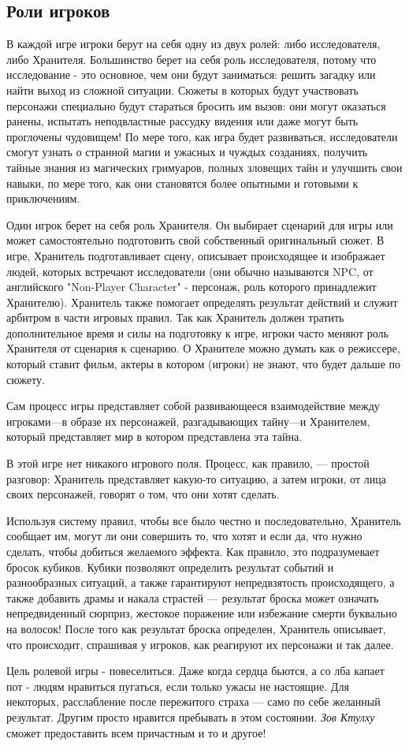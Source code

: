 \documentclass[letterpaper,twocolumn,openany, twoside, 8pt, usenames]{cocbook}
\begin{document}
\subsection*{Роли игроков}

В каждой игре игроки берут на себя одну из двух ролей: либо исследователя, либо Хранителя. Большинство берет на себя роль исследователя, потому что исследование - это основное, чем они будут заниматься: решить загадку или найти выход из сложной ситуации. Сюжеты в которых будут участвовать персонажи специально будут стараться бросить им вызов: они могут оказаться ранены, испытать неподвластные рассудку видения или даже могут быть проглочены чудовищем! По мере того, как игра будет развиваться, исследователи смогут узнать о странной магии и ужасных и чуждых созданиях, получить тайные знания из магических гримуаров, полных зловещих тайн и улучшить свои навыки, по мере того, как они становятся более опытными и готовыми к приключениям.

Один игрок берет на себя роль Хранителя. Он выбирает сценарий для игры или может самостоятельно подготовить свой собственный оригинальный сюжет. В игре, Хранитель подготавливает сцену, описывает происходящее и изображает людей, которых встречают исследователи (они обычно называются NPC, от английского "Non-Player Character" - персонаж, роль которого принадлежит Хранителю). Хранитель также помогает определять результат действий и служит арбитром в части игровых правил. Так как Хранитель должен тратить дополнительное время и силы на подготовку к игре, игроки часто меняют роль Хранителя от сценария к сценарию. О Хранителе можно думать как о режиссере, который ставит фильм, актеры в котором (игроки) не знают, что будет дальше по сюжету.

Сам процесс игры представляет собой развивающееся взаимодействие между игроками---в образе их персонажей, разгадывающих тайну---и Хранителем, который представляет мир в котором представлена эта тайна.

В этой игре нет никакого игрового поля. Процесс, как правило, --- простой разговор: Хранитель представляет какую-то ситуацию, а затем игроки, от лица своих персонажей, говорят о том, что они хотят сделать.

Используя систему правил, чтобы все было честно и последовательно, Хранитель сообщает им, могут ли они совершить то, что хотят и если да, что нужно сделать, чтобы добиться желаемого эффекта. Как правило, это подразумевает бросок кубиков. Кубики позволяют определить результат событий и разнообразных ситуаций, а также гарантируют непредвзятость происходящего, а также добавить драмы и накала страстей --- результат броска может означать непредвиденный сюрприз, жестокое поражение или избежание смерти буквально на волосок! После того как результат броска определен, Хранитель описывает, что происходит, спрашивая у игроков, как реагируют их персонажи и так далее.

Цель ролевой игры - повеселиться. Даже когда сердца бьются, а со лба капает пот - людям нравиться пугаться, если только ужасы не настоящие. Для некоторых, расслабление после пережитого страха --- само по себе желанный результат. Другим просто нравится пребывать в этом состоянии. {\it Зов Ктулху} сможет предоставить всем причастным и то и другое!
\end{document}
